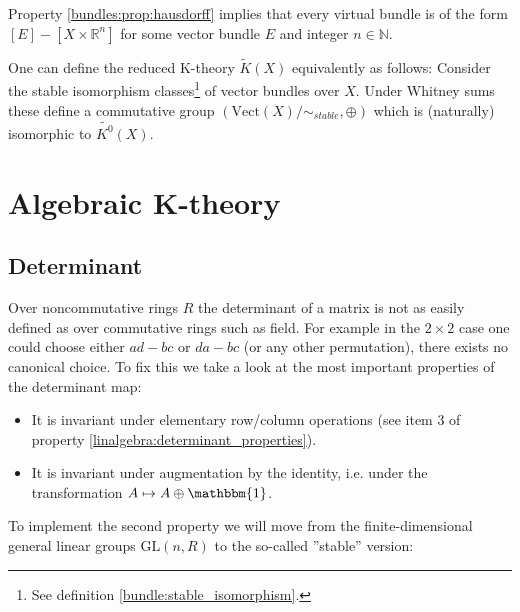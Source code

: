     \begin{property}
        Property \ref{bundles:prop:hausdorff} implies that every virtual bundle is of the form $[E] - [X\times\mathbb{R}^n]$ for some vector bundle $E$ and integer $n\in\mathbb{N}$.
    \end{property}


    \begin{adefinition}
        One can define the reduced K-theory $\widetilde{K}(X)$ equivalently as follows: Consider the stable isomorphism classes\footnote{See definition \ref{bundle:stable_isomorphism}.} of vector bundles over $X$. Under Whitney sums these define a commutative group $(\text{Vect}(X)/\sim_{stable}, \oplus)$ which is (naturally) isomorphic to $\widetilde{K^0}(X)$.
    \end{adefinition}

\section{Algebraic K-theory}
\subsection{Determinant}

    Over noncommutative rings $R$ the determinant of a matrix is not as easily defined as over commutative rings such as field. For example in the $2\times2$ case one could choose either $ad-bc$ or $da-bc$ (or any other permutation), there exists no canonical choice. To fix this we take a look at the most important properties of the determinant map:
    \begin{itemize}
        \item It is invariant under elementary row/column operations (see item 3 of property \ref{linalgebra:determinant_properties}).
        \item It is invariant under augmentation by the identity, i.e. under the transformation $A\mapsto A\oplus\mathbbm{1}$.
    \end{itemize}
    To implement the second property we will move from the finite-dimensional general linear groups $\text{GL}(n, R)$ to the so-called ''stable'' version:

